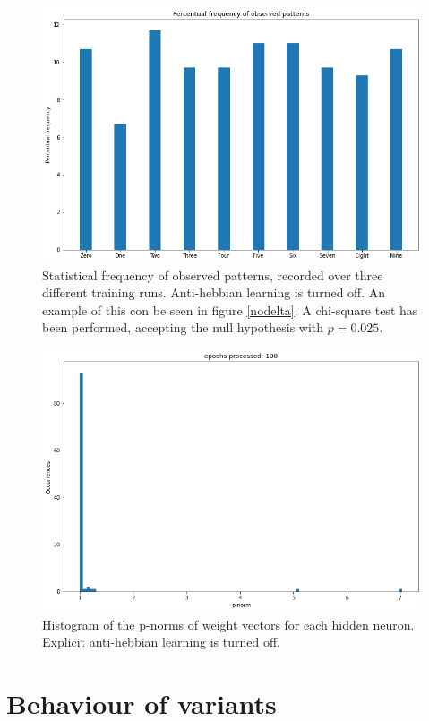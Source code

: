 \documentclass[a4paper]{report}
\begin{document}
\begin{figure} [H]
    \centering
    \includegraphics [width=12cm ] {o/bar1.png}
    \caption{Statistical frequency of observed patterns, recorded over three different training runs. Anti-hebbian learning is turned off. An example of this con be seen in figure \ref{nodelta}. A chi-square test has been performed, accepting the null hypothesis with $p  = 0.025$.}
    \label{o/cerchio2}
\end{figure}
\begin{figure} [H]
\centering
\includegraphics [width=12cm ] {o/ii_hist.png}
\caption{Histogram of the p-norms of weight vectors for each hidden neuron. Explicit anti-hebbian learning is turned off.}
\label{ii_hist}
\end{figure}

\chapter{Behaviour of variants}
\end{document}
